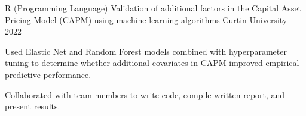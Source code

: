 \begin{cventries}
  \cventry
    {R (Programming Language)} %
    {Validation of additional factors in the Capital Asset Pricing Model (CAPM) using machine learning algorithms} %
    {Curtin University} %
    {2022} %
    {
      \begin{cvitems} %
        \item {Used Elastic Net and Random Forest models combined with hyperparameter tuning to determine whether additional covariates in CAPM improved empirical predictive performance.}
        \item {Collaborated with team members to write code, compile written report, and present results.}
      \end{cvitems}
    }
\end{cventries}
